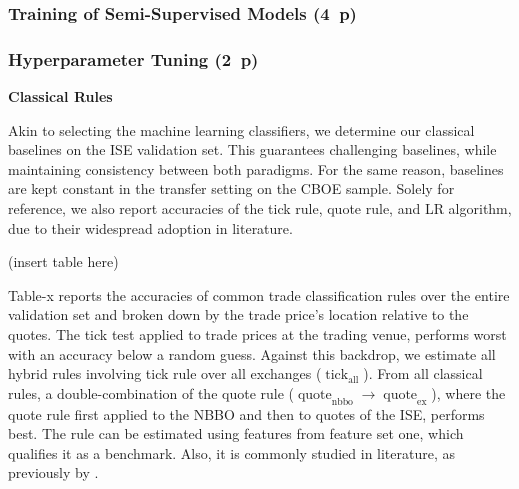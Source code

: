 \subsubsection{Training of Semi-Supervised
    Models (4~p)}\label{sec:training-of-semi-supervised-models}


\subsubsection{Hyperparameter Tuning (2~p)}\label{sec:hyperparameter-tuning}






\textbf{Classical Rules}

Akin to selecting the machine learning classifiers, we determine our classical baselines on the \gls{ISE} validation set. This guarantees challenging baselines, while maintaining consistency between both paradigms. For the same reason, baselines are kept constant in the transfer setting on the \gls{CBOE} sample. Solely for reference, we also report accuracies of the tick rule, quote rule, and \gls{LR} algorithm, due to their widespread adoption in literature.

(insert table here)

Table-x reports the accuracies of common trade classification rules over the entire validation set and broken down by the trade price's location relative to the quotes. The tick test applied to trade prices at the trading venue, performs worst with an accuracy below a random guess. Against this backdrop, we estimate all hybrid rules involving tick rule over all exchanges ($\operatorname{tick}_{\text{all}}$). From all classical rules, a double-combination of the quote rule ($\operatorname{quote}_{\text{nbbo}} \to \operatorname{quote}_{\text{ex}}$), where the quote rule first applied to the \gls{NBBO} and then to quotes of the \gls{ISE}, performs best. The rule can be estimated using features from feature set one, which qualifies it as a benchmark. Also, it is commonly studied in literature, as previously by \textcite[][]{muravyevOptionsTradingCosts2020}.

